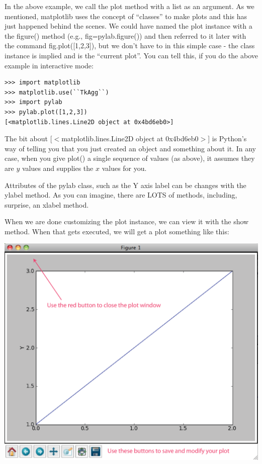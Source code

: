 \documentclass[11pt]{book}
\begin{document}
{{In the above example, we call the {\color{blue}plot} method with a list as an argument.  As we mentioned, {\color{blue}matplotlib} uses the concept of ``classes'' to make plots and this has just happened behind the scenes. We could have named the plot instance with a the {\color{blue}figure()} method (e.g.,  {\color{blue}fig=pylab.figure()}) and then referred to it later with the command  {\color{blue}fig.plot([1,2,3])}, but we don't have to in this simple case - the class instance is implied and is the ``current plot''.  You can tell this, if you do the above example in interactive mode:

{ \color{blue}\begin{verbatim}
>>> import matplotlib
>>> matplotlib.use(``TkAgg``)
>>> import pylab
>>> pylab.plot([1,2,3])
[<matplotlib.lines.Line2D object at 0x4bd6eb0>]
\end{verbatim}}
\noindent The bit about {\color{blue}[$<$matplotlib.lines.Line2D object at 0x4bd6eb0$>$]} is Python's way of telling you that you just created an object and something about it.
In any case, when you give {\color{blue} plot()} a single sequence of values (as above), it assumes they are $y$ values and supplies the $x$ values for you.

Attributes of the {\color{blue}pylab} class, such as the Y axis label can be changes with the {\color{blue}ylabel} method.  As you can imagine, there are LOTS of methods, including, surprise, an {\color{blue}xlabel} method.

When we are done customizing the plot instance, we can view it with the {\color{blue}show} method.  When that gets executed, we will get a plot something like this:

   \includegraphics[width=15cm]{EPSfiles/matplotlib1.eps}

}}
\end{document}
